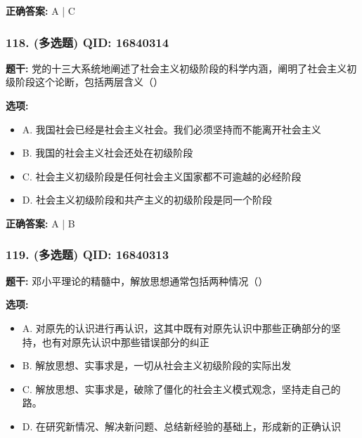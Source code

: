 \documentclass[12pt,UTF8]{ctexart}
\begin{document}
\textbf{正确答案:}
A | C

\vspace{0.3em}\hrulefill\vspace{0.7em}

\subsubsection*{118. (多选题) \small QID: 16840314}

\textbf{题干:}
党的十三大系统地阐述了社会主义初级阶段的科学内涵，阐明了社会主义初级阶段这个论断，包括两层含义（）

\textbf{选项:}
\begin{itemize}[leftmargin=*]

  \item A. 我国社会已经是社会主义社会。我们必须坚持而不能离开社会主义

  \item B. 我国的社会主义社会还处在初级阶段

  \item C. 社会主义初级阶段是任何社会主义国家都不可逾越的必经阶段

  \item D. 社会主义初级阶段和共产主义的初级阶段是同一个阶段

\end{itemize}

\textbf{正确答案:}
A | B

\vspace{0.3em}\hrulefill\vspace{0.7em}

\subsubsection*{119. (多选题) \small QID: 16840313}

\textbf{题干:}
邓小平理论的精髓中，解放思想通常包括两种情况（）

\textbf{选项:}
\begin{itemize}[leftmargin=*]

  \item A. 对原先的认识进行再认识，这其中既有对原先认识中那些正确部分的坚持，也有对原先认识中那些错误部分的纠正

  \item B. 解放思想、实事求是，一切从社会主义初级阶段的实际出发

  \item C. 解放思想、实事求是，破除了僵化的社会主义模式观念，坚持走自己的路。

  \item D. 在研究新情况、解决新问题、总结新经验的基础上，形成新的正确认识

\end{itemize}
\end{document}

